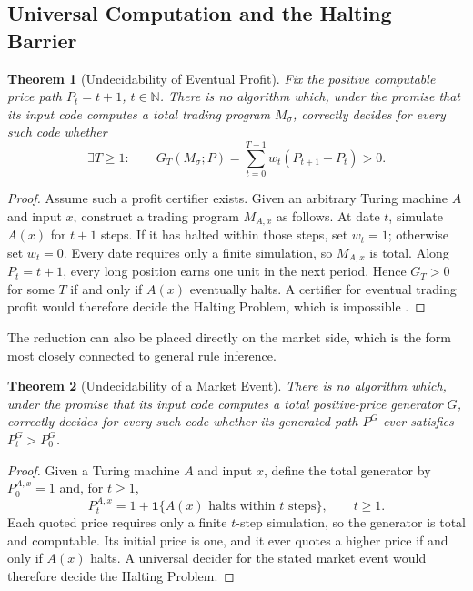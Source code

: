 \documentclass[aps,pra,reprint,superscriptaddress,amsmath,amssymb,floatfix]{revtex4-2}
\theoremstyle{plain}
\newtheorem{theorem}{Theorem}
\theoremstyle{definition}
\theoremstyle{remark}
\begin{document}
\subsection{Universal Computation and the Halting Barrier}

\begin{theorem}[Undecidability of Eventual Profit]
  \label{thm:profit-undecidable}
  Fix the positive computable price path \(P_t=t+1\), \(t\in\mathbb{N}\).
  There is no algorithm which, under the promise that its input code computes
  a total trading program \(M_\sigma\), correctly decides for every such code
  whether
  \[
    \exists T\geq1:\qquad
    G_T(M_\sigma;P)=
    \sum_{t=0}^{T-1}w_t(P_{t+1}-P_t)>0.
  \]
\end{theorem}

\begin{proof}
Assume such a profit certifier exists. Given an arbitrary Turing machine
\(A\) and input \(x\), construct a trading program \(M_{A,x}\) as follows.
At date \(t\), simulate \(A(x)\) for \(t+1\) steps. If it has halted within
those steps, set \(w_t=1\); otherwise set \(w_t=0\). Every date requires only
a finite simulation, so \(M_{A,x}\) is total. Along \(P_t=t+1\), every long
position earns one unit in the next period. Hence \(G_T>0\) for some \(T\) if
and only if \(A(x)\) eventually halts. A certifier for eventual trading profit
would therefore decide the Halting Problem, which is impossible
\cite{turing-36}.
\end{proof}

The reduction can also be placed directly on the market side, which is the
form most closely connected to general rule inference.

\begin{theorem}[Undecidability of a Market Event]
  \label{thm:market-undecidable}
  There is no algorithm which, under the promise that its input code computes
  a total positive-price generator \(G\), correctly decides for every such
  code whether its generated path \(P^G\) ever satisfies \(P_t^G>P_0^G\).
\end{theorem}

\begin{proof}
Given a Turing machine \(A\) and input \(x\), define the total generator by
\(P_0^{A,x}=1\) and, for \(t\geq1\),
\begin{equation}
  P_t^{A,x}
  =1+\mathbf{1}\{A(x)\text{ halts within }t\text{ steps}\},
  \qquad t\geq1 .
  \label{eq:market-halting}
\end{equation}
Each quoted price requires only a finite \(t\)-step simulation, so the
generator is total and computable. Its initial price is one, and it ever quotes
a higher price if and only if \(A(x)\) halts. A universal decider for the stated
market event would therefore decide the Halting Problem.
\end{proof}
\end{document}
